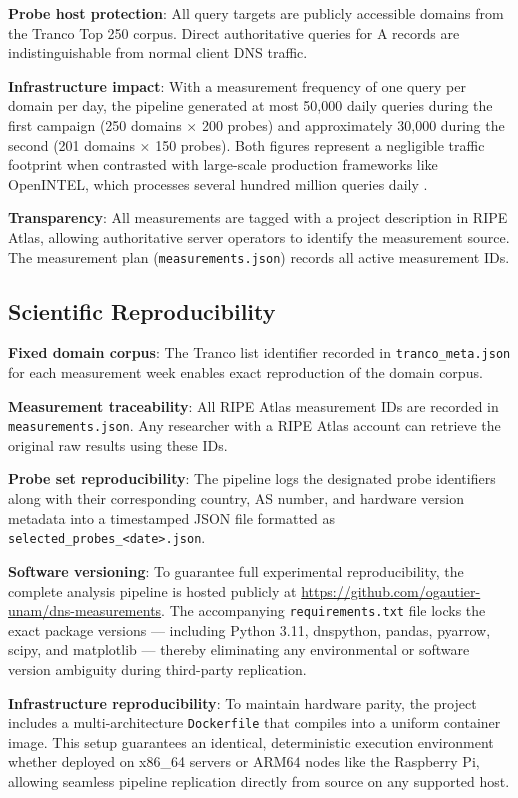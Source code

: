 \textbf{Probe host protection}: All query targets are publicly accessible domains from the Tranco Top 250 corpus. Direct authoritative queries for \ac{A} records are indistinguishable from normal client \ac{DNS} traffic.

\textbf{Infrastructure impact}: With a measurement frequency of one query per domain per day, the pipeline generated at most 50,000 daily queries during the first campaign (250 domains $\times$ 200 probes) and approximately 30,000 during the second (201 domains $\times$ 150 probes). Both figures represent a negligible traffic footprint when contrasted with large-scale production frameworks like OpenINTEL, which processes several hundred million queries daily \cite{vanRijswijk2016}.

\textbf{Transparency}: All measurements are tagged with a project description in RIPE Atlas, allowing authoritative server operators to identify the measurement source. The measurement plan (\texttt{measure\-ments.json}) records all active measurement IDs.

\subsection{Scientific Reproducibility}
\label{subsec:3.6.2}

\textbf{Fixed domain corpus}: The Tranco list identifier recorded in \texttt{tranco\_meta.json} for each measurement week enables exact reproduction of the domain corpus.

\textbf{Measurement traceability}: All RIPE Atlas measurement IDs are recorded in \texttt{measurements.json}. Any researcher with a RIPE Atlas account can retrieve the original raw results using these IDs.

\textbf{Probe set reproducibility}: The pipeline logs the designated probe identifiers along with their corresponding country, \ac{AS} number, and hardware version metadata into a timestamped JSON file formatted as \texttt{selected\_probes\_<date>.json}.

\textbf{Software versioning}: To guarantee full experimental reproducibility, the complete analysis pipeline is hosted publicly at \url{https://github.com/ogautier-unam/dns-measurements}. The accompanying \texttt{require\-ments.\-txt} file locks the exact package versions — including Python 3.11, dnspython, pandas, pyarrow, scipy, and matplotlib — thereby eliminating any environmental or software version ambiguity during third-party replication.

\textbf{Infrastructure reproducibility}: To maintain hardware parity, the project includes a multi-architecture \texttt{Dockerfile} that compiles into a uniform container image. This setup guarantees an identical, deterministic execution environment whether deployed on x86\_64 servers or ARM64 nodes like the Raspberry Pi, allowing seamless pipeline replication directly from source on any supported host.

